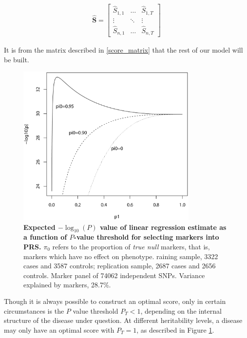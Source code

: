 \begin{equation} 
\label{score_matrix}
\begin{aligned}
\mathbf{\hat{S}} = \begin{bmatrix} \hat{S}_{1,1} & \dots & \hat{S}_{1, T} \\ \vdots & \ddots & \vdots \\ \hat{S}_{n, 1} & \dots & \hat{S}_{n, T} \end{bmatrix}
\end{aligned}
\end{equation}

It is from the matrix described in \ref{score_matrix} that the rest of our model will be built.

\begin{figure}[h]
\label{pi0}
\centering
\includegraphics[width=0.8\textwidth]{Figures/pi0.png}
\caption[Expected $-\log_{10} (P)$ value of linear regression estimate as a function of $P$-value threshold for selecting markers into \ac{PRS}.]{\textbf{Expected $-\log_{10} (P)$ value of linear regression estimate as a function of $P$-value threshold for selecting markers into \ac{PRS}.} $\pi_0$ refers to the proportion of \textit{true null} markers, that is, markers which have no effect on phenotype. raining sample, 3322 cases and 3587 controls; replication sample, 2687 cases and 2656 controls. Marker panel of 74062 independent SNPs. Variance explained by markers, 28.7\%.\citep{Dudbridge2013}}
\end{figure}

\begin{rem}
Though it is always possible to construct an optimal score, only in certain circumstances is the $P$ value threshold $P_T < 1$, depending on the internal structure of the disease under question. At different heritability levels, a disease may only have an optimal score with $P_T =1$, as described in Figure \ref{pi0}.
\end{rem} 

